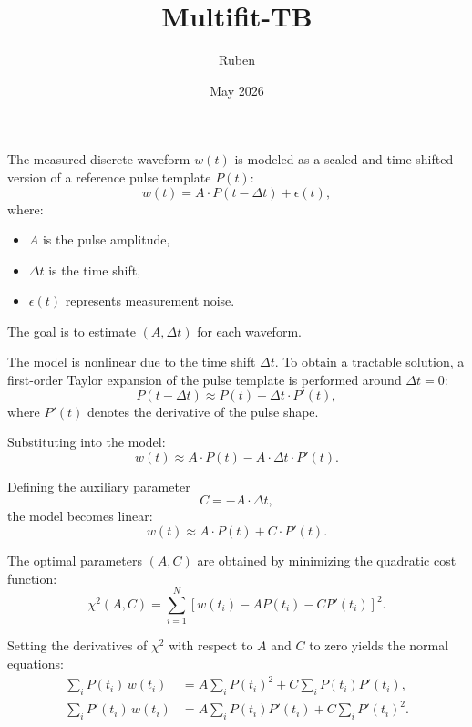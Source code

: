 \documentclass{article}
\title{Multifit-TB}
\author{Ruben }
\date{May 2026}
\begin{document}
\maketitle



The measured discrete waveform $w(t)$ is modeled as a scaled and time-shifted version of a reference pulse template $P(t)$:
\begin{equation}
w(t) = A \cdot P(t - \Delta t) + \epsilon(t),
\end{equation}
where:
\begin{itemize}
    \item $A$ is the pulse amplitude,
    \item $\Delta t$ is the time shift,
    \item $\epsilon(t)$ represents measurement noise.
\end{itemize}

The goal is to estimate $(A, \Delta t)$ for each waveform.


The model is nonlinear due to the time shift $\Delta t$. To obtain a tractable solution, a first-order Taylor expansion of the pulse template is performed around $\Delta t = 0$:
\begin{equation}
P(t - \Delta t) \approx P(t) - \Delta t \cdot P'(t),
\end{equation}
where $P'(t)$ denotes the derivative of the pulse shape.

Substituting into the model:
\begin{equation}
w(t) \approx A \cdot P(t) - A \cdot \Delta t \cdot P'(t).
\end{equation}

Defining the auxiliary parameter
\begin{equation}
C = -A \cdot \Delta t,
\end{equation}
the model becomes linear:
\begin{equation}
w(t) \approx A \cdot P(t) + C \cdot P'(t).
\end{equation}


The optimal parameters $(A, C)$ are obtained by minimizing the quadratic cost function:
\begin{equation}
\chi^2(A, C) = \sum_{i=1}^{N} \left[ w(t_i) - A P(t_i) - C P'(t_i) \right]^2.
\end{equation}

Setting the derivatives of $\chi^2$ with respect to $A$ and $C$ to zero yields the normal equations:
\begin{align}
\sum_i P(t_i)\, w(t_i) &= A \sum_i P(t_i)^2 + C \sum_i P(t_i) P'(t_i), \\
\sum_i P'(t_i)\, w(t_i) &= A \sum_i P(t_i) P'(t_i) + C \sum_i P'(t_i)^2.
\end{align}
\end{document}
